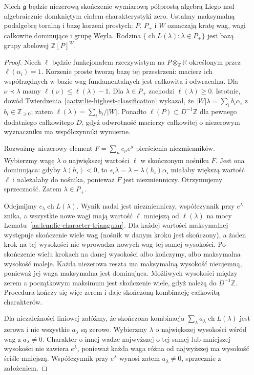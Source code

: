 \begin{twierdzenie}
\label{aa:tw:lie-character-basis}
Niech $\mathfrak g$ będzie niezerową skończenie wymiarową półprostą algebrą Liego nad algebraicznie domkniętym ciałem charakterystyki zero. Ustalmy maksymalną podalgebrę toralną i bazę korzeni prostych; $P$, $P_+$ i $W$ oznaczają kratę wag, wagi całkowite dominujące i grupę Weyla. Rodzina $\{\operatorname{ch}L(\lambda):\lambda\in P_+\}$ jest bazą grupy abelowej $\mathbb Z[P]^W$.
\end{twierdzenie}
\begin{proof}
Niech $\ell$ będzie funkcjonałem rzeczywistym na $P\otimes_{\mathbb Z}\mathbb R$ określonym przez $\ell(\alpha_i)=1$. Korzenie proste tworzą bazę tej przestrzeni: macierz ich współrzędnych w bazie wag fundamentalnych jest całkowita i odwracalna. Dla $\nu\prec\lambda$ mamy $\ell(\nu)\le\ell(\lambda)-1$. Dla $\lambda\in P_+$ zachodzi $\ell(\lambda)\ge0$. Istotnie, dowód Twierdzenia~\ref{aa:tw:lie-highest-classification} wykazał, że $|W|\lambda=\sum_i b_i\alpha_i$ z $b_i\in\mathbb Z_{\ge0}$; zatem $\ell(\lambda)=\sum_i b_i/|W|$. Ponadto $\ell(P)\subset D^{-1}\mathbb Z$ dla pewnego dodatniego całkowitego $D$, gdyż odwrotność macierzy całkowitej o niezerowym wyznaczniku ma współczynniki wymierne.

Rozważmy niezerowy element $F=\sum_\mu c_\mu e^\mu$ pierścienia niezmienników. Wybierzmy wagę $\lambda$ o największej wartości $\ell$ w skończonym nośniku $F$. Jest ona dominująca: gdyby $\lambda(h_i)<0$, to $s_i\lambda=\lambda-\lambda(h_i)\alpha_i$ miałaby większą wartość $\ell$ i należałaby do nośnika, ponieważ $F$ jest niezmienniczy. Otrzymujemy sprzeczność. Zatem $\lambda\in P_+$.

Odejmijmy $c_\lambda\operatorname{ch}L(\lambda)$. Wynik nadal jest niezmienniczy, współczynnik przy $e^\lambda$ znika, a wszystkie nowe wagi mają wartość $\ell$ mniejszą od $\ell(\lambda)$ na mocy Lematu~\ref{aa:lem:lie-character-triangular}. Dla każdej wartości maksymalnej występuje skończenie wiele wag (nośnik w danym kroku jest skończony), a żaden krok na tej wysokości nie wprowadza nowych wag tej samej wysokości. Po skończenie wielu krokach na danej wysokości albo kończymy, albo maksymalna wysokość maleje. Każda niezerowa reszta ma maksymalną wysokość nieujemną, ponieważ jej waga maksymalna jest dominująca. Możliwych wysokości między zerem a początkowym maksimum jest skończenie wiele, gdyż należą do $D^{-1}\mathbb Z$. Procedura kończy się więc zerem i daje skończoną kombinację całkowitą charakterów.

Dla niezależności liniowej załóżmy, że skończona kombinacja $\sum_{\lambda} a_\lambda\operatorname{ch}L(\lambda)$ jest zerowa i nie wszystkie $a_\lambda$ są zerowe. Wybierzmy $\lambda$ o największej wysokości wśród wag z $a_\lambda\ne0$. Charakter o innej wadze najwyższej o tej samej lub mniejszej wysokości nie zawiera $e^\lambda$, ponieważ każda waga różna od najwyższej ma wysokość ściśle mniejszą. Współczynnik przy $e^\lambda$ wynosi zatem $a_\lambda\ne0$, sprzecznie z założeniem.
\end{proof}

